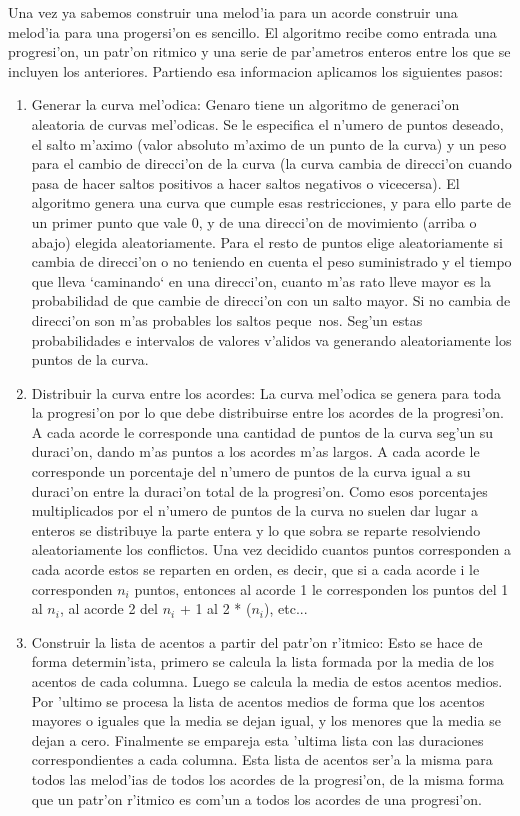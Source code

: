﻿\documentclass[a4paper,12pt]{article}
\begin{document}
Una vez ya sabemos construir una melod'ia para un acorde construir una melod'ia para una progersi'on es sencillo. El algoritmo recibe como entrada una progresi'on, un patr'on ritmico y una serie de par'ametros enteros entre los que se incluyen los anteriores. Partiendo esa informacion aplicamos los siguientes pasos:
        \begin{enumerate}
        \item Generar la curva mel'odica: Genaro tiene un algoritmo de generaci'on aleatoria de curvas mel'odicas. Se le especifica el n'umero de puntos deseado, el salto m'aximo (valor absoluto m'aximo de un punto de la curva) y un peso para el cambio de direcci'on de la curva (la curva cambia de direcci'on cuando pasa de hacer saltos positivos a hacer saltos negativos o vicecersa). El algoritmo genera una curva que cumple esas restricciones, y para ello parte de un primer punto que vale 0, y de una direcci'on de movimiento (arriba o abajo) elegida aleatoriamente. Para el resto de puntos elige aleatoriamente si cambia de direcci'on o no teniendo en cuenta el peso suministrado y el tiempo que lleva `caminando` en una direcci'on, cuanto m'as rato lleve mayor es la probabilidad de que cambie de direcci'on con un salto mayor. Si no cambia de direcci'on son m'as probables los saltos peque~nos. Seg'un estas probabilidades e intervalos de valores v'alidos va generando aleatoriamente los puntos de la curva.
        \item Distribuir la curva entre los acordes: La curva mel'odica se genera para toda la progresi'on por lo que debe distribuirse entre los acordes de la progresi'on. A cada acorde le corresponde una cantidad de puntos de la curva seg'un su duraci'on, dando m'as puntos a los acordes m'as largos. A cada acorde le corresponde un porcentaje del n'umero de puntos de la curva igual a su duraci'on entre la duraci'on total de la progresi'on. Como esos porcentajes multiplicados por el n'umero de puntos de la curva no suelen dar lugar a enteros se distribuye la parte entera y lo que sobra se reparte resolviendo aleatoriamente los conflictos. Una vez decidido cuantos puntos corresponden a cada acorde estos se reparten en orden, es decir, que si a cada acorde i le corresponden $n_{i}$ puntos, entonces al acorde 1 le corresponden los puntos del 1 al $n_{i}$, al acorde 2 del $n_{i}$ + 1 al 2 * ($n_{i}$), etc...
	\item Construir la lista de acentos a partir del patr'on r'itmico: Esto se hace de forma determin'ista, primero se calcula la lista formada por la media de los acentos de cada columna. Luego se calcula la media de estos acentos medios. Por 'ultimo se procesa la lista de acentos medios de forma que los acentos mayores o iguales que la media se dejan igual, y los menores que la media se dejan a cero. Finalmente se empareja esta 'ultima lista con las duraciones correspondientes a cada columna. Esta lista de acentos ser'a la misma para todos las melod'ias de todos los acordes de la progresi'on, de la misma forma que un patr'on r'itmico es com'un a todos los acordes de una progresi'on.

\end{enumerate}
\end{document}
